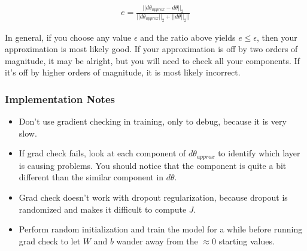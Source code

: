 \documentclass{article}
\begin{document}
\begin{align}
e = \frac{||d\theta_{approx} - d\theta||_2}{||d\theta_{approx}||_2 + ||d\theta||_2||}
\end{align}

In general, if you choose any value $\epsilon$ and the ratio above yields $e \leq \epsilon$, then your approximation is most likely good.  If your approximation is off by two orders of magnitude, it may be alright, but you will need to check all your components.  If it's off by higher orders of magnitude, it is most likely incorrect.

\subsubsection{Implementation Notes}

\begin{itemize}
\item Don't use gradient checking in training, only to debug, because it is very slow.
\item If grad check fails, look at each component of $d\theta_{approx}$ to identify which layer is causing problems.  You should notice that the component is quite a bit different than the similar component in $d\theta$.
\item Grad check doesn't work with dropout regularization, because dropout is randomized and makes it difficult to compute $J$.
\item Perform random initialization and train the model for a while before running grad check to let $W$ and $b$ wander away from the $\approx 0$ starting values.
\end{itemize}
\end{document}
